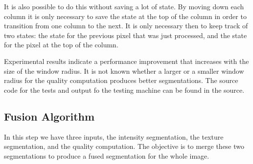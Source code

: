 \documentclass[twocolumn]{article}
\begin{document}
It is also possible to do this without saving a lot of
state. By moving down each column it is only necessary to save
the state at the top of the column in order to transition from
one column to the next. It is only necessary then to keep
track of two states: the state for the previous pixel that was
just processed, and the state for the pixel at the top of the column.

Experimental results indicate a performance improvement that
increases with the size of the window radius. It is not known 
whether a larger or a smaller window radius for the quality computation 
produces better segmentations. The source code for the tests and output fo
the testing machine can be found in the source.

\subsection{Fusion Algorithm}

In this step we have three inputs, the intensity segmentation, the
texture segmentation, and the quality computation. The objective is to
merge these two segmentations to produce a fused segmentation for the
whole image. 
\end{document}
